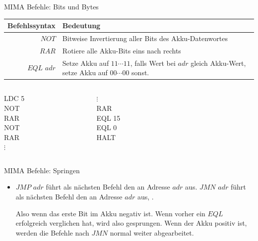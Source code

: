\documentclass[handout]{beamer}
\begin{document}
\begin{frame}{MIMA Befehle: Bits und Bytes }
	\begin{tabular}{r | p{8cm} }
		Befehlssyntax & Bedeutung\\\hline\hline 
		$NOT$ & Bitweise Invertierung aller Bits des Akku-Datenwortes\\\hline
		$RAR$ & Rotiere alle Akku-Bits eins nach rechts\\\hline
		$EQL$ $adr$ & Setze Akku auf $11\cdots11$, falls Wert bei $adr$ gleich Akku-Wert, setze Akku auf $00\cdots00$ sonst.\\\hline
	\end{tabular}
	
	\bp 
	\vspace{.5cm}
	\vspace{.2cm}
	
	\begin{columns}
		\begin{column}{0.25\textwidth}
			LDC 5 \\ NOT \\ RAR \\ NOT \\ RAR \\ $\vdots$
		\end{column}
		\begin{column}{0.25\textwidth}
			$\vdots$ \\ RAR \\ EQL 15 \\ EQL 0 \\ HALT
		\end{column}
		
		\begin{column}{0.5\textwidth}
		\end{column}
	\end{columns}
\end{frame}

\begin{frame}{MIMA Befehle: Springen}
	\begin{itemize}
		\pitem Normalerweise wird die Instruktionsadresse nach jedem Befehl um eins erhöht
		\pitem Also Befehle werden von oben nach unten abgearbeitet
		\pitem Mit Sprüngen kann man die MIMA zwingen, zu definierten Befehlen zu springen und damit die Vorgehensreihenfolge zu beeinflussen
		
		\vspace{.3cm} \bp
		
		\item $JMP$ $adr$ führt als nächsten Befehl den an Adresse $adr$ aus.
		\pitem $JMN$ $adr$ führt als nächsten Befehl den an Adresse $adr$ aus, .
		\begin{itemize}
			\pitem Also wenn das erste Bit im Akku negativ ist.
			\pitem Wenn vorher ein $EQL$ erfolgreich verglichen hat, wird also gesprungen.
			\pitem Wenn der Akku positiv ist, werden die Befehle nach $JMN$ normal weiter abgearbeitet.
		\end{itemize}
	\end{itemize}
\end{frame}
	
\end{document}
